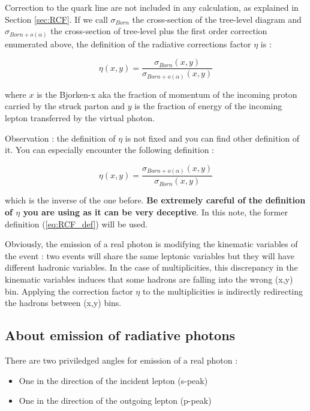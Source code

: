 Correction to the quark line are not included in any calculation, as explained in Section \ref{sec:RCF}.
If we call $\sigma_{Born}$ the cross-section of the tree-level diagram and $\sigma_{Born+o(\alpha)}$ the
cross-section of tree-level plus the first order correction enumerated above, the definition of the
radiative corrections factor $\eta$ is :

\begin{equation} \label{eq:RCF_def}
  \eta(x,y)=\frac{\sigma_{Born}(x,y)}{\sigma_{Born+o(\alpha)}(x,y)}
\end{equation}

where $x$ is the Bjorken-x aka the fraction of momentum of the incoming proton carried by the struck parton
and $y$ is the fraction of energy of the incoming lepton transferred by the virtual photon.

Observation : the definition of $\eta$ is not fixed and you can find other definition of it.
You can especially encounter the following definition :

\begin{equation} \label{eq:RCF_def_inv}
  \eta(x,y)=\frac{\sigma_{Born+o(\alpha)}(x,y)}{\sigma_{Born}(x,y)}
\end{equation}

which is the inverse of the one before. \textbf{Be extremely careful of the definition of $\eta$ you are using
as it can be very deceptive}. In this note, the former definition (\ref{eq:RCF_def}) will be used.

Obviously, the emission of a real photon is modifying the kinematic variables of the event : two events
will share the same leptonic variables but they will have different hadronic variables. In the case of multiplicities, this discrepancy in the kinematic variables induces that
some hadrons are falling into the wrong (x,y) bin. Applying the correction factor $\eta$ to the multiplicities
is indirectly redirecting the hadrons between (x,y) bins.

\subsection{About emission of radiative photons}

There are two priviledged angles for emission of a real photon :
\begin{itemize}
\item One in the direction of the incident lepton (s-peak)
\item One in the direction of the outgoing lepton (p-peak)
\end{itemize}

